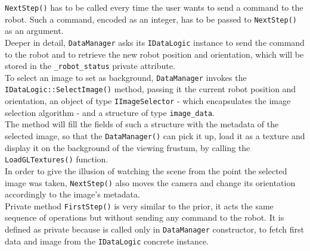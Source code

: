 \texttt{NextStep()} has to be called every time 
the user wants to send a command to the robot.
Such a command, encoded as an integer, has to be passed to 
\texttt{NextStep()} as an argument.
\\
Deeper in detail, \texttt{DataManager} asks its \texttt{IDataLogic} 
instance to send the command to the robot and to 
retrieve the new robot position and orientation, which will be 
stored in the \texttt{\_robot\_status} private attribute.
\\
To select an image to set as background, \texttt{DataManager} 
invokes the \\
\texttt{IDataLogic::SelectImage()} method, 
passing it the current robot position and orientation, 
an object of type \texttt{IImageSelector} - which 
encapsulates the image selection algorithm - and a structure 
of type \texttt{image\_data}.
\\
The method will fill the fields of such a structure with 
the metadata of the selected image, so that the 
\texttt{DataManager()} can pick it up, load it as a 
texture and display it on the background of the 
viewing frustum, by calling the 
\texttt{LoadGLTextures()} function.
\\
In order to give the illusion of watching the scene 
from the point the selected image was taken, 
\texttt{NextStep()} also moves the camera and change 
its orientation accordingly to the image's metadata.
\\
Private method \texttt{FirstStep()} is very similar to the
prior, it acts the same sequence of operations but 
without sending any command to the robot. It is defined as private
because is called only in \texttt{DataManager} constructor,
to fetch first data and image from the \texttt{IDataLogic}
concrete instance.
